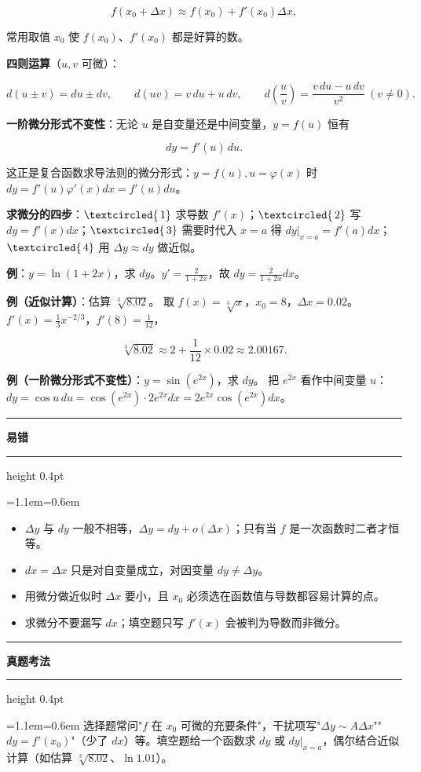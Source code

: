 \documentclass[11pt,openany,UTF8]{ctexbook}
\newcommand{\circled}[1]{\textcircled{\scriptsize\,#1}}
\newcommand{\callouthead}[2]{%
  \par\addvspace{7pt}\noindent
  {\color{#1}\rule[-0.15em]{3pt}{1.05em}}\hspace{0.5em}%
  {\bfseries\color{#1}#2}\par\nobreak\vspace{-0.35em}%
  {\color{rulesep}\hrule height 0.4pt}\nobreak\vspace{0.45em}%
  \begingroup\small\setlength{\parindent}{0pt}%
  \leftskip=1.1em\rightskip=0.6em\noindent\ignorespaces}
\newcommand{\calloutend}{\par\endgroup\addvspace{7pt}}
\newenvironment{callwarn}[1]{\callouthead{warnbar}{#1}}{\calloutend}
\newenvironment{callexam}[1]{\callouthead{exambar}{#1}}{\calloutend}
\begin{document}
\[f(x_0+\Delta x)\approx f(x_0)+f'(x_0)\Delta x,\]

常用取值 $x_0$ 使 $f(x_0)$、$f'(x_0)$ 都是好算的数。

\textbf{四则运算}（$u,v$ 可微）：

\[d(u\pm v)=du\pm dv,\qquad d(uv)=v\,du+u\,dv,\qquad d\!\left(\frac uv\right)=\frac{v\,du-u\,dv}{v^2}\ (v\ne0).\]

\textbf{一阶微分形式不变性}：无论 $u$ 是自变量还是中间变量，$y=f(u)$ 恒有

\[dy=f'(u)\,du.\]

这正是复合函数求导法则的微分形式：$y=f(u),u=\varphi(x)$ 时 $dy=f'(u)\varphi'(x)dx=f'(u)du$。

\textbf{求微分的四步}：$\circled{1}$ 求导数 $f'(x)$；$\circled{2}$ 写 $dy=f'(x)dx$；$\circled{3}$ 需要时代入 $x=a$ 得 $dy|_{x=a}=f'(a)dx$；$\circled{4}$ 用 $\Delta y\approx dy$ 做近似。

\textbf{例}：$y=\ln(1+2x)$，求 $dy$。$y'=\frac{2}{1+2x}$，故 $dy=\frac{2}{1+2x}dx$。

\textbf{例（近似计算）}：估算 $\sqrt[3]{8.02}$。 取 $f(x)=\sqrt[3]{x}$，$x_0=8$，$\Delta x=0.02$。$f'(x)=\frac{1}{3}x^{-2/3}$，$f'(8)=\frac{1}{12}$，

\[\sqrt[3]{8.02}\approx 2+\frac{1}{12}\times 0.02\approx 2.00167.\]

\textbf{例（一阶微分形式不变性）}：$y=\sin(e^{2x})$，求 $dy$。 把 $e^{2x}$ 看作中间变量 $u$：$dy=\cos u\,du=\cos(e^{2x})\cdot 2e^{2x}dx=2e^{2x}\cos(e^{2x})dx$。

\begin{callwarn}{易错}
\begin{itemize}
\item $\Delta y$ 与 $dy$ 一般不相等，$\Delta y=dy+o(\Delta x)$；只有当 $f$ 是一次函数时二者才恒等。
\item $dx=\Delta x$ 只是对自变量成立，对因变量 $dy\ne\Delta y$。
\item 用微分做近似时 $\Delta x$ 要小，且 $x_0$ 必须选在函数值与导数都容易计算的点。
\item 求微分不要漏写 $dx$；填空题只写 $f'(x)$ 会被判为导数而非微分。
\end{itemize}
\end{callwarn}

\begin{callexam}{真题考法}
选择题常问"$f$ 在 $x_0$ 可微的充要条件"，干扰项写"$\Delta y\sim A\Delta x$""$dy=f'(x_0)$"（少了 $dx$）等。填空题给一个函数求 $dy$ 或 $dy|_{x=a}$，偶尔结合近似计算（如估算 $\sqrt[3]{8.02}$、$\ln 1.01$）。

\end{callexam}
\end{document}
